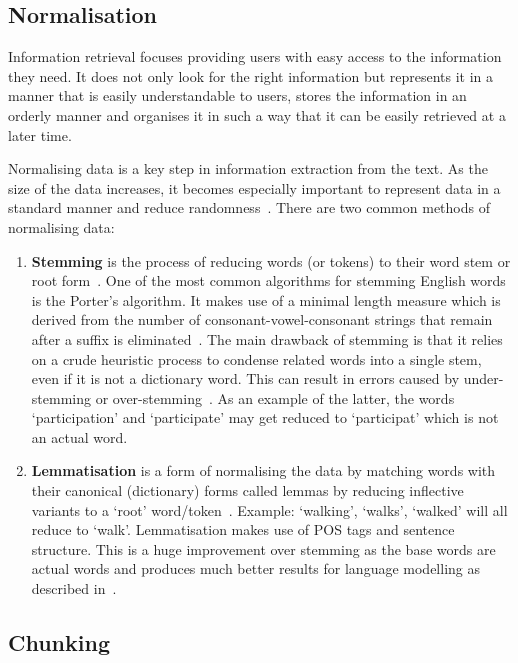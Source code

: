 \subsection{Normalisation} \label{normalisation}

Information retrieval focuses providing users with easy access to the information they need. It does not only look for the right information but represents it in a manner that is easily understandable to users, stores the
information in an orderly manner and organises it in such a
way that it can be easily retrieved at a later time.

Normalising data is a key step in information extraction from the text. As the size of the data increases, it becomes especially important to represent data in a standard manner and reduce randomness~\cite{stemming}. There are two common methods of normalising data: 

\begin{enumerate}
    \item \textbf{Stemming} is the process of reducing words (or tokens) to their word stem or root form~\cite{stemming}. One of the most common algorithms for stemming English words is the Porter's algorithm. It makes use of a minimal length measure which is derived from the number of consonant-vowel-consonant strings that remain after a suffix is eliminated~\cite{porter}. The main drawback of stemming is that it relies on a crude heuristic process to condense related words into a single stem, even if it is not a dictionary word. This can result in errors caused by under-stemming or over-stemming~\cite{medium_stemming}. As an example of the latter, the words `participation' and `participate' may get reduced to `participat' which is not an actual word. 
    
    \item \textbf{Lemmatisation} is a form of normalising the data by matching words with their canonical (dictionary) forms called lemmas by reducing inflective variants to a `root' word/token~\cite{stemming}. Example: `walking', `walks', `walked' will all reduce to `walk'. Lemmatisation makes use of POS tags and sentence structure. This is a huge improvement over stemming as the base words are actual words and produces much better results for language modelling as described in~\cite{stemming}. 
    
\end{enumerate}

\subsection{Chunking}

